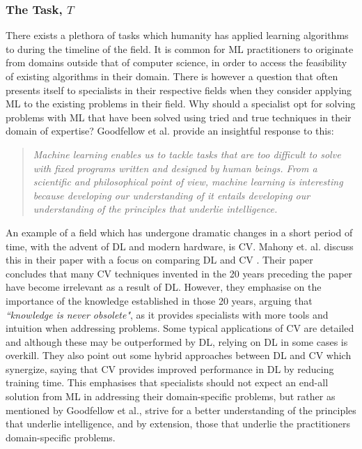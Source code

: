 \subsubsection{The Task, $T$}
There exists a plethora of tasks which humanity has applied learning algorithms
to during the timeline of the field. It is common for \gls{ML} practitioners to
originate from domains outside that of computer science, in order to access the
feasibility of existing algorithms in their domain. There is however a question
that often presents itself to specialists in their respective fields when they
consider applying \gls{ML} to the existing problems in their field. Why should a
specialist opt for solving problems with \gls{ML} that have been solved using
tried and true techniques in their domain of expertise? Goodfellow et al.
\cite{Goodfellow-et-al-2016} provide an insightful response to this:

\begin{quotation}
    \textit{Machine learning enables us to tackle tasks that are too difficult
    to solve with fixed programs written and designed by human beings. From a
    scientific and philosophical point of view, machine learning is interesting
    because developing our understanding of it entails developing our
    understanding of the principles that underlie intelligence. }
\end{quotation}
An example of a field which has undergone dramatic changes in a short period of
time, with the advent of \gls{DL} and modern hardware, is \gls{CV}. Mahony et.
al. discuss this in their paper with a focus on comparing \gls{DL} and \gls{CV}
\cite{Mahony-et-al-2020}. Their paper concludes that many \gls{CV} techniques
invented in the 20 years preceding the paper have become irrelevant as a result
of \gls{DL}. However, they emphasise on the importance of the knowledge
established in those 20 years, arguing that \textit{``knowledge is never
obsolete"}, as it provides specialists with more tools and intuition when
addressing problems. Some typical applications of \gls{CV} are detailed and
although these may be outperformed by \gls{DL}, relying on \gls{DL} in some
cases is overkill. They also point out some hybrid approaches between \gls{DL}
and \gls{CV} which synergize, saying that \gls{CV} provides improved performance
in \gls{DL} by reducing training time. This emphasises that specialists should
not expect an end-all solution from \gls{ML} in addressing their domain-specific
problems, but rather as mentioned by Goodfellow et al., strive for a better
understanding of the principles that underlie intelligence, and by extension,
those that underlie the practitioners domain-specific problems.

